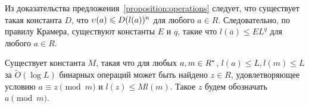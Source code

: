 \documentclass[_00_dissertation.tex]{subfiles}
\begin{document}
\begin{remark}
    Из доказательства предложения~\ref{proposition:operations} следует, что существует такая константа $D$, что $\upsilon(a) \leqslant D (l(a))^n$ для любого $a \in R$.
    Следовательно, по правилу Крамера, существуют константы $E$ и $q$, такие что $l(\overline{a}) \leq E L^q$ для любого $a \in R$.
\end{remark}

\begin{proposition}\label{proposition:mod}
    Существует константа $M$, такая что для любых $a, m \in R^{*}$, $l(a) \leq L, l(m) \leq L$ за $\tilde{O}(\log L)$ бинарных операций может быть найдено $z \in R$, удовлетворяющее условию $a \equiv z \pmod{m}$ и $l(z) \leq M l(m)$.
    Такое $z$ будем обозначать $a \pmod{m}$.
\end{proposition}
\end{document}
